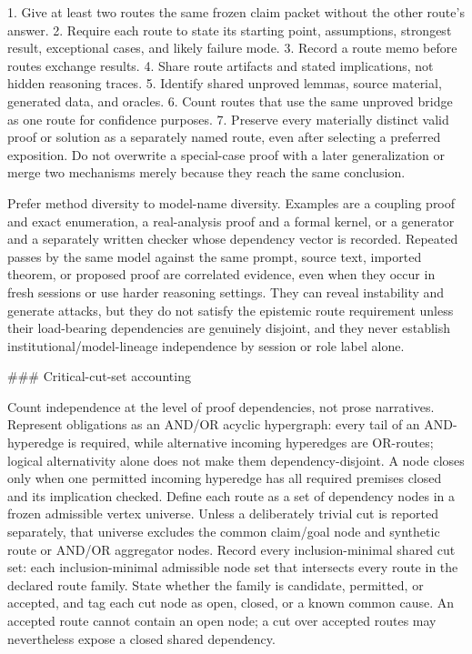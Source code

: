 \documentclass[11pt]{article}
\begin{document}
\begin{markdown}
1. Give at least two routes the same frozen claim packet without the other route's answer.
2. Require each route to state its starting point, assumptions, strongest result, exceptional
   cases, and likely failure mode.
3. Record a route memo before routes exchange results.
4. Share route artifacts and stated implications, not hidden reasoning traces.
5. Identify shared unproved lemmas, source material, generated data, and oracles.
6. Count routes that use the same unproved bridge as one route for confidence purposes.
7. Preserve every materially distinct valid proof or solution as a separately named route, even
   after selecting a preferred exposition. Do not overwrite a special-case proof with a later
   generalization or merge two mechanisms merely because they reach the same conclusion.

Prefer method diversity to model-name diversity. Examples are a coupling proof and exact
enumeration, a real-analysis proof and a formal kernel, or a generator and a separately written
checker whose dependency vector is recorded. Repeated passes by the same model against the same
prompt, source text, imported theorem,
or proposed proof are correlated evidence, even when they occur in fresh sessions or use harder
reasoning settings. They can reveal instability and generate attacks, but they do not satisfy the
epistemic route requirement unless their load-bearing dependencies are genuinely disjoint, and
they never establish institutional/model-lineage independence by session or role label alone.

### Critical-cut-set accounting

Count independence at the level of proof dependencies, not prose narratives. Represent
obligations as an AND/OR acyclic hypergraph: every tail of an AND-hyperedge is required, while
alternative incoming hyperedges are OR-routes; logical alternativity alone does not make them
dependency-disjoint. A node closes only when one permitted incoming hyperedge has all required
premises closed and its implication checked. Define each route as a set of dependency nodes in a
frozen admissible vertex universe. Unless a deliberately trivial cut is reported separately, that
universe excludes the common claim/goal node and synthetic route or AND/OR aggregator nodes. Record
every inclusion-minimal shared cut set: each inclusion-minimal admissible node set that intersects
every route in the declared route family. State whether the family is candidate, permitted, or accepted, and tag
each cut node as open, closed, or a known common cause. An accepted route cannot contain an open
node; a cut over accepted routes may nevertheless expose a closed shared dependency.


\end{markdown}
\end{document}
